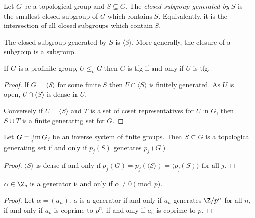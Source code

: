 \documentclass[a4paper]{article}
\begin{document}
\begin{definition}
  Let \(G\) be a topological group and \(S \subseteq G\). The \emph{closed subgroup generated by \(S\)} is the smallest closed subgroup of \(G\) which contains \(S\). Equivalently, it is the intersection of all closed subgroups which contain \(S\).
\end{definition}

\begin{ex}
  The closed subgroup generated by \(S\) is \(\overline{\langle S\rangle}\). More generally, the closure of a subgroup is a subgroup.
\end{ex}

\begin{proposition}
  If \(G\) is a profinite group, \(U \leq_o G\) then \(G\) is tfg if and only if \(U\) is tfg. 
\end{proposition}

\begin{proof}
  If \(G = \overline{\langle S\rangle}\) for some finite \(S\) then \(U \cap \langle S\rangle\) is finitely generated. As \(U\) is open, \(U \cap \langle S\rangle\) is dense in \(U\).

  Conversely if \(U = \overline{\langle S\rangle}\) and \(T\) is a set of coset representatives for \(U\) in \(G\), then \(S \cup T\) is a finite generating set for \(G\).
\end{proof}

\begin{proposition}
  Let \(G = \varprojlim G_j\) be an inverse system of finite groups. Then \(S \subseteq G\) is a topological generating set if and only if \(p_j(S)\) generates \(p_j(G)\).
\end{proposition}

\begin{proof}
  \(\langle S\rangle\) is dense if and only if \(p_j(G) = p_j(\langle S\rangle) = \langle p_j(S)\rangle\) for all \(j\).
\end{proof}

\begin{proposition}
  \(\alpha \in \Z_p\) is a generator is and only if \(\alpha \ne 0 \pmod p\).
\end{proposition}

\begin{proof}
  Let \(\alpha = (a_n)\). \(\alpha\) is a generator if and only if \(a_n\) generates \(\Z/p^n\) for all \(n\), if and only if \(a_n\) is coprime to \(p^n\), if and only if \(a_n\) is coprime to \(p\).
\end{proof}
\end{document}

